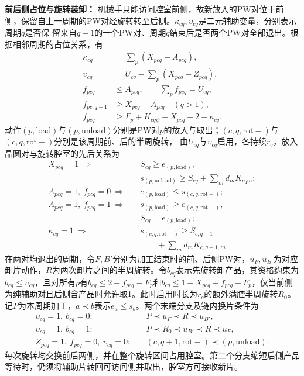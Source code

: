 \documentclass[preprint,12pt,nonatbib]{elsarticle}
\begin{document}
\noindent\textbf{前后侧占位与旋转装卸：}
机械手只能访问腔室前侧，故新放入的PW对位于前侧，保留自上一周期的PW对经旋转转至后侧。$\kappa_{cq},\upsilon_{cq}$是二元辅助变量，分别表示周期$q$是否保
留来自$q-1$的一个PW对、周期$q$结束后是否两个PW对全部退出。根据相邻周期的占位关系，有
\begin{equation}
\begin{aligned}
\kappa_{cq}&=\sum_p(X_{pcq}-A_{pcq}),\\
\upsilon_{cq}&=U_{cq}-\sum_p(X_{pcq}-Z_{pcq}),\\
f_{pcq}&\le A_{pcq},\qquad\sum_pf_{pcq}=U_{cq},\\
f_{pc,q-1}&\ge X_{pcq}-A_{pcq}\quad(q>1),\\
f_{pcq}&\ge F_p+K_{cq\psi}+X_{pcq}-2-\kappa_{cq}.
\end{aligned}
\label{eq:cycle-side-cn}
\end{equation}
动作$(p,\mathrm{load})$与$(p,\mathrm{unload})$分别是PW对$p$的放入与取出；$(c,q,\mathrm{rot-})$与$(c,q,\mathrm{rot+})$分别是该周期前、后的半周旋转，
由$U_{cq}$与$\upsilon_{cq}$启用，各持续$r_c$，放入晶圆对与旋转腔室的先后关系为
\begin{equation}
\begin{aligned}
X_{pcq}=1\ \Rightarrow\quad
&S_{cq}\ge e_{(p,\mathrm{load})},\\
&s_{(p,\mathrm{unload})}\ge S_{cq}+\sum_m d_mK_{cqm};\\
A_{pcq}=1,\ f_{pcq}=0\ \Rightarrow\quad
&e_{(p,\mathrm{load})}\le s_{(c,q,\mathrm{rot-})};\\
A_{pcq}=1,\ f_{pcq}=1\ \Rightarrow\quad
&s_{(p,\mathrm{load})}\ge e_{(c,q,\mathrm{rot-})},\\
&S_{cq}=e_{(p,\mathrm{load})};\\
\kappa_{cq}=1\ \Rightarrow\quad
&s_{(c,q,\mathrm{rot-})}\ge S_{c,q-1}\\
&\qquad+\sum_m d_mK_{c,q-1,m}.
\end{aligned}
\label{eq:cycle-load-cn}
\end{equation}
在两对均退出的周期，令$F,B'$分别为加工结束时的前、后侧PW对，$u_F,u_{B'}$为对应卸片动作，$R$为两次卸片之间的半周旋转。令$b_{cq}$表示先旋转卸产品，其资格约束为$b_{cq}\le\upsilon_{cq}$，且对所有$p$有$b_{cq}\le2-f_{pcq}-F_p$和$b_{cq}\le1-X_{pcq}+f_{pcq}+F_p$，仅当前侧为纯辅助对且后侧含产品时允许取1。此时启用时长为$r_c$的额外满腔半周旋转$R_0$。记$P$为本周期加工，$a\prec b$表示$e_a\le s_b$。两个末端分支及链内换片条件为
\begin{equation}
\begin{aligned}
\upsilon_{cq}=1,\ b_{cq}=0:\quad
   &P\prec u_F\prec R\prec u_{B'},\\
\upsilon_{cq}=1,\ b_{cq}=1:\quad
   &P\prec R_0\prec u_{B'}\prec R\prec u_F,\\
Z_{pcq}=1,\ f_{pcq}=0,\ \upsilon_{cq}=0:\quad
   & (c,q+1,\mathrm{rot-})\prec(p,\mathrm{unload}).
\end{aligned}
\label{eq:cycle-unload-cn}
\end{equation}
每次旋转均交换前后两侧，并在整个旋转区间占用腔室。第二个分支缩短后侧产品等待时，仍须将辅助片转回可访问侧并取出，腔室方可接收新片。
\end{document}
